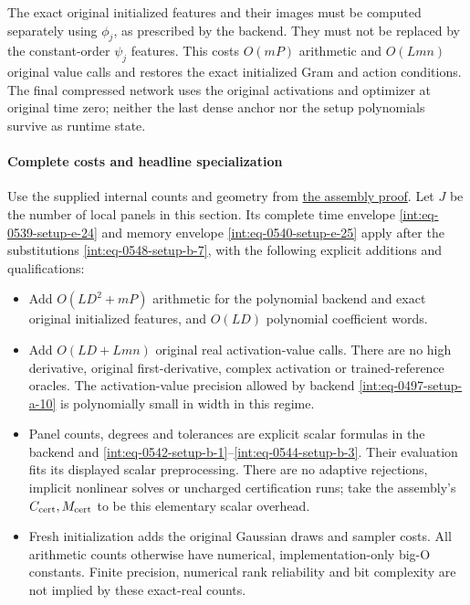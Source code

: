 
The exact original initialized features and their images must be computed separately using \(\phi_j\), as prescribed by the backend. They must not be replaced by the constant-order \(\psi_j\) features. This costs \(O(mP)\) arithmetic and \(O(Lmn)\) original value calls and restores the exact initialized Gram and action conditions. The final compressed network uses the original activations and optimizer at original time zero; neither the last dense anchor nor the setup polynomials survive as runtime state.


\paragraph{Complete costs and headline specialization}
\label{int:setup-bridge-3}
\mbox{}\par\smallskip


Use the supplied internal counts and geometry from \hyperref[int:setup-assembly]{the assembly proof}. Let \(J\) be the number of local panels in this section. Its complete time envelope \hyperref[int:eq-setup-e-24]{\eqref{int:eq-0539-setup-e-24}} and memory envelope \hyperref[int:eq-setup-e-25]{\eqref{int:eq-0540-setup-e-25}} apply after the substitutions \hyperref[int:eq-setup-b-7]{\eqref{int:eq-0548-setup-b-7}}, with the following explicit additions and qualifications:


\begin{itemize}
\item Add \(O(LD^2+mP)\) arithmetic for the polynomial backend and exact original initialized features, and \(O(LD)\) polynomial coefficient words.
\item Add \(O(LD+Lmn)\) original real activation-value calls. There are no high derivative, original first-derivative, complex activation or trained-reference oracles. The activation-value precision allowed by backend \hyperref[int:eq-setup-a-10]{\eqref{int:eq-0497-setup-a-10}} is polynomially small in width in this regime.
\item Panel counts, degrees and tolerances are explicit scalar formulas in the backend and \hyperref[int:eq-setup-b-1]{\eqref{int:eq-0542-setup-b-1}}--\allowbreak \hyperref[int:eq-setup-b-3]{\eqref{int:eq-0544-setup-b-3}}. Their evaluation fits its displayed scalar preprocessing. There are no adaptive rejections, implicit nonlinear solves or uncharged certification runs; take the assembly's \(C_{\rm cert},\allowbreak M_{\rm cert}\) to be this elementary scalar overhead.
\item Fresh initialization adds the original Gaussian draws and sampler costs. All arithmetic counts otherwise have numerical, implementation-only big-O constants. Finite precision, numerical rank reliability and bit complexity are not implied by these exact-real counts.
\end{itemize}

